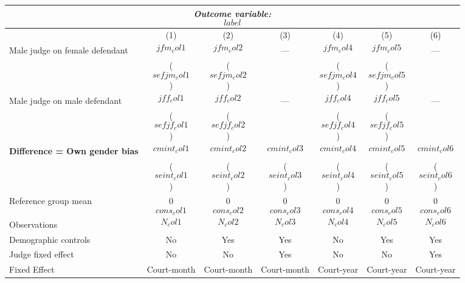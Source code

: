 {
\def\sym#1{\ifmmode^{#1}\else\(^{#1}\)\fi}
\begin{tabular}{l*{6}{c}}
  \hline\hline
\multicolumn{7}{c}{\textit{Outcome variable: $$label$$}}\\
\hline
&\multicolumn{1}{c}{(1)}&\multicolumn{1}{c}{(2)}&\multicolumn{1}{c}{(3)}&\multicolumn{1}{c}{(4)}&\multicolumn{1}{c}{(5)}&\multicolumn{1}{c}{(6)}\\
\hline
Male judge on female defendant \hspace{15mm} & $$jfm_col1$$ & $$jfm_col2$$ & --- & $$jfm_col4$$ & $$jfm_col5$$ & --- \\
& ($$sefjm_col1$$) & ($$sefjm_col2$$) &  & ($$sefjm_col4$$) &($$sefjm_col5$$) &  \\
Male judge on male defendant \hspace{15mm} & $$jff_col1$$ & $$jff_col2$$ & ---& $$jff_col4$$ & $$jff_col5$$ & --- \\
& ($$sefjf_col1$$) & ($$sefjf_col2$$) &  & ($$sefjf_col4$$) & ($$sefjf_col5$$) &  \\
\textbf{Difference = Own gender bias} \hspace{15mm} & $$cmint_col1$$ & $$cmint_col2$$ & $$cmint_col3$$ & $$cmint_col4$$ & $$cmint_col5$$ & $$cmint_col6$$ \\
& ($$seint_col1$$) & ($$seint_col2$$) & ($$seint_col3$$) & ($$seint_col4$$) & ($$seint_col5$$) & ($$seint_col6$$) \\
\hline
Reference group mean & 0$$cons_col1$$ & 0$$cons_col2$$ & 0$$cons_col3$$ & 0$$cons_col4$$ & 0$$cons_col5$$ & 0$$cons_col6$$ \\
Observations & $$N_col1$$ & $$N_col2$$ & $$N_col3$$ & $$N_col4$$ & $$N_col5$$ & $$N_col6$$ \\
Demographic controls & No & Yes & Yes & No & Yes & Yes \\
Judge fixed effect & No & No & Yes & No & No & Yes \\
Fixed Effect & Court-month & Court-month & Court-month & Court-year & Court-year & Court-year \\
\hline\hline
\end{tabular}
}
 
